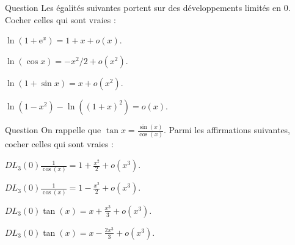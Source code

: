 \begin{multi}[multiple,feedback=
{On a : 
\[\begin{array}{l}\displaystyle \ln\left(1+\mathrm{e}^x\right)=\ln \left(2+x+o(x)\right)=\ln 2+\frac{x}{2}+o(x)\\ \\ \displaystyle \ln\left(\cos x\right)=\ln \left(1-\frac{x^2}{2}+o(x^2)\right)=-\frac{x^2}{2}+o(x^2),\\ \\ \displaystyle \ln\left(1+\sin x\right)=\ln \left(1+x+o(x^2)\right)=x-x^2/2+o(x^2)\end{array}\] et enfin
\[\displaystyle \ln(1-x^2)-\ln \left((1+x)^2\right)=\ln(1-x^2)-\ln \left(1+2x+x^2\right)=-2x+o(x).\]
}]{Question}
Les égalités suivantes portent sur des développements limités en \(0\). Cocher celles qui sont vraies :

    \item \(\displaystyle \ln\left(1+\mathrm{e}^x\right)=1+x+o(x)\).
    \item* \(\displaystyle \ln\left(\cos x\right)=-x^2/2+o(x^2)\).
    \item \(\displaystyle \ln\left(1+\sin x\right)=x+o(x^2)\).
    \item \(\displaystyle \ln(1-x^2)-\ln \left((1+x)^2\right)=o(x)\).
\end{multi}


\begin{multi}[multiple,feedback=
{On utilise \(\displaystyle DL_3(0)\frac{1}{1+t}=1-t+t^2-t^3+o(t^2)\) avec \(\displaystyle t=\cos (x)-1=\frac{x^2}{2}+o(x^3)\). On obtient :
\(\displaystyle DL_3(0)\frac{1}{\cos (x)}=1+\frac{x^2}{2}+o(x^3)\). Ensuite, on effectue le produit \(\displaystyle \sin (x)\times \frac{1}{\cos (x)}\) :
\[\displaystyle DL_3(0)\tan (x)=x+\frac{x^3}{3}+o(x^3).\]
}]{Question}
On rappelle que \(\displaystyle \tan x=\frac{\sin (x)}{\cos (x)}\). Parmi les affirmations suivantes, cocher celles qui sont vraies :

    \item* \(\displaystyle DL_3(0)\frac{1}{\cos (x)}=1+\frac{x^2}{2}+o(x^3)\).
    \item \(\displaystyle DL_3(0)\frac{1}{\cos (x)}=1-\frac{x^2}{2}+o(x^3)\).
    \item* \(\displaystyle DL_3(0)\tan (x)=x+\frac{x^3}{3}+o(x^3)\).
    \item \(\displaystyle DL_3(0)\tan (x)=x-\frac{2x^3}{3}+o(x^3)\).
\end{multi}



